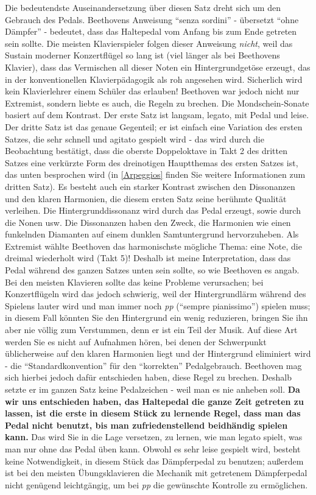 Die bedeutendste Auseinandersetzung über diesen Satz dreht sich um den Gebrauch des Pedals.
Beethovens Anweisung \enquote{senza sordini} - übersetzt \enquote{ohne Dämpfer} - bedeutet, dass das Haltepedal vom Anfang bis zum Ende getreten sein sollte.
Die meisten Klavierspieler folgen dieser Anweisung \textit{nicht}, weil das Sustain moderner Konzertflügel so lang ist (viel länger als bei Beethovens Klavier), dass das Vermischen all dieser Noten ein Hintergrundgetöse erzeugt, das in der konventionellen Klavierpädagogik als roh angesehen wird.
Sicherlich wird kein Klavierlehrer einem Schüler das erlauben!
Beethoven war jedoch nicht nur Extremist, sondern liebte es auch, die Regeln zu brechen.
Die Mondschein-Sonate basiert auf dem Kontrast.
Der erste Satz ist langsam, legato, mit Pedal und leise.
Der dritte Satz ist das genaue Gegenteil; er ist einfach eine Variation des ersten Satzes, die sehr schnell und agitato gespielt wird - das wird durch die Beobachtung bestätigt, dass die oberste Doppeloktave in Takt 2 des dritten Satzes eine verkürzte Form des dreinotigen Hauptthemas des ersten Satzes ist, das unten besprochen wird (in \hyperref[Arpeggios]{\autoref{Arpeggios}} finden Sie weitere Informationen zum dritten Satz).
Es besteht auch ein starker Kontrast zwischen den Dissonanzen und den klaren Harmonien, die diesem ersten Satz seine berühmte Qualität verleihen.
Die Hintergrunddissonanz wird durch das Pedal erzeugt, sowie durch die Nonen usw.
Die Dissonanzen haben den Zweck, die Harmonien wie einen funkelnden Diamanten auf einem dunklen Samtuntergrund hervorzuheben.
Als Extremist wählte Beethoven das harmonischste mögliche Thema: eine Note, die dreimal wiederholt wird (Takt 5)!
Deshalb ist meine Interpretation, dass das Pedal während des ganzen Satzes unten sein sollte, so wie Beethoven es angab.
Bei den meisten Klavieren sollte das keine Probleme verursachen;
bei Konzertflügeln wird das jedoch schwierig, weil der Hintergrundlärm während des Spielens lauter wird und man immer noch \textit{pp} (\enquote{sempre pianissimo}) spielen muss; in diesem Fall könnten Sie den Hintergrund ein wenig reduzieren, bringen Sie ihn aber nie völlig zum Verstummen, denn er ist ein Teil der Musik.
Auf diese Art werden Sie es nicht auf Aufnahmen hören, bei denen der Schwerpunkt üblicherweise auf den klaren Harmonien liegt und der Hintergrund eliminiert wird - die \enquote{Standardkonvention} für den \enquote{korrekten} Pedalgebrauch.
Beethoven mag sich hierbei jedoch dafür entschieden haben, diese Regel zu brechen.
Deshalb setzte er im ganzen Satz keine Pedalzeichen - weil man es nie anheben soll.
\textbf{Da wir uns entschieden haben, das Haltepedal die ganze Zeit getreten zu lassen, ist die erste in diesem Stück zu lernende Regel, dass man das Pedal nicht benutzt, bis man zufriedenstellend beidhändig spielen kann.}
Das wird Sie in die Lage versetzen, zu lernen, wie man legato spielt, was man nur ohne das Pedal üben kann.
Obwohl es sehr leise gespielt wird, besteht keine Notwendigkeit, in diesem Stück das Dämpferpedal zu benutzen; außerdem ist bei den meisten Übungsklavieren die Mechanik mit getretenem Dämpferpedal nicht genügend leichtgängig, um bei \textit{pp} die gewünschte Kontrolle zu ermöglichen.

